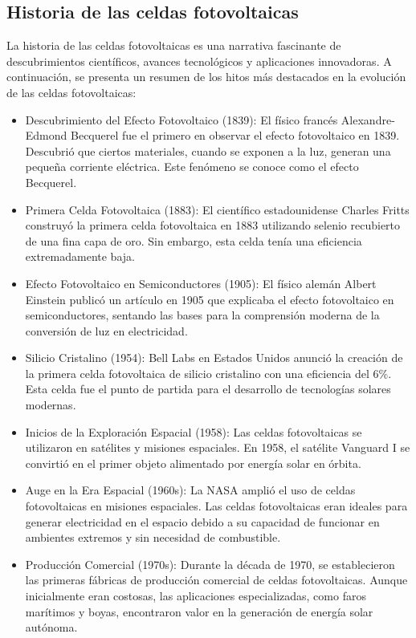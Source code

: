 \documentclass[10.5pt]{article}
\begin{document}
    \subsection{Historia de las celdas fotovoltaicas}
    La historia de las celdas fotovoltaicas es una narrativa fascinante de descubrimientos científicos, avances tecnológicos y aplicaciones innovadoras. A continuación, se presenta un resumen de los hitos más destacados en la evolución de las celdas fotovoltaicas:
    \begin{itemize}
        \item Descubrimiento del Efecto Fotovoltaico (1839): El físico francés Alexandre-Edmond Becquerel fue el primero en observar el efecto fotovoltaico en 1839. Descubrió que ciertos materiales, cuando se exponen a la luz, generan una pequeña corriente eléctrica. Este fenómeno se conoce como el efecto Becquerel.
        \item Primera Celda Fotovoltaica (1883): El científico estadounidense Charles Fritts construyó la primera celda fotovoltaica en 1883 utilizando selenio recubierto de una fina capa de oro. Sin embargo, esta celda tenía una eficiencia extremadamente baja.
        \item Efecto Fotovoltaico en Semiconductores (1905): El físico alemán Albert Einstein publicó un artículo en 1905 que explicaba el efecto fotovoltaico en semiconductores, sentando las bases para la comprensión moderna de la conversión de luz en electricidad.
        \item Silicio Cristalino (1954): Bell Labs en Estados Unidos anunció la creación de la primera celda fotovoltaica de silicio cristalino con una eficiencia del $6\%$. Esta celda fue el punto de partida para el desarrollo de tecnologías solares modernas.
        \item Inicios de la Exploración Espacial (1958): Las celdas fotovoltaicas se utilizaron en satélites y misiones espaciales. En 1958, el satélite Vanguard I se convirtió en el primer objeto alimentado por energía solar en órbita.
        \item Auge en la Era Espacial (1960s): La NASA amplió el uso de celdas fotovoltaicas en misiones espaciales. Las celdas fotovoltaicas eran ideales para generar electricidad en el espacio debido a su capacidad de funcionar en ambientes extremos y sin necesidad de combustible.
        \item Producción Comercial (1970s): Durante la década de 1970, se establecieron las primeras fábricas de producción comercial de celdas fotovoltaicas. Aunque inicialmente eran costosas, las aplicaciones especializadas, como faros marítimos y boyas, encontraron valor en la generación de energía solar autónoma.

\end{itemize}
\end{document}
